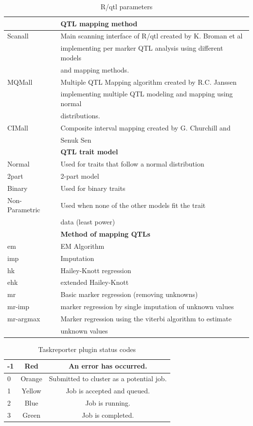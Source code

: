 \begin{table}[h!t]
	\caption{R/qtl parameters}
	\centering
	\begin{tabular}{| l | l | }
	\hline
	&\bf QTL mapping method\\
	\hline
	Scanall	&Main scanning interface of R/qtl created by K. Broman et al\\
			&implementing per marker QTL analysis using different models \\
			&and mapping methods.\\
	\hline
	MQMall	&Multiple QTL Mapping algorithm created by R.C. Janssen\\
			&implementing multiple QTL modeling and mapping using normal\\ 
			&distributions.\\
	\hline
	CIMall	&Composite interval mapping created by G. Churchill and \\
			&Senuk Sen\\
	\hline
	&\bf QTL trait model\\
	\hline
	Normal & Used for traits that follow a normal distribution\\
	\hline
	2part & 2-part model\\
	\hline
	Binary & Used for binary traits\\
	\hline
	Non-Parametric & Used when none of the other models fit the trait\\
		&data (least power)\\
	\hline
	&\bf Method of mapping QTLs\\
	\hline
	em & EM Algorithm\\
	\hline
	imp & Imputation\\
	\hline
	hk & Hailey-Knott regression\\
	\hline
	ehk & extended Hailey-Knott\\
	\hline
	mr & Basic marker regression (removing unknowns)\\
	\hline
    mr-imp & marker regression by single imputation of unknown values\\
	\hline
	mr-argmax & Marker regression using the viterbi algorithm to estimate \\
	& unknown values\\
	\hline
	\end{tabular}
	\label{tbl:tabelPARAMS}
\end{table}

\begin{table}[h!t]
	\caption{Taskreporter plugin status codes}
	\centering
	\begin{tabular}{| l | c | c | }
	\hline
	-1	&Red	&An error has occurred.\\
	\hline
	0	&Orange	&Submitted to cluster as a potential job.\\
	\hline
	1	&Yellow	&Job is accepted and queued.\\
	\hline
	2	&Blue	&Job is running.\\
	\hline
	3	&Green	&Job is completed.\\
	\hline
	\end{tabular}
	\label{tbl:tabelSTATUS}
\end{table}
\clearpage
